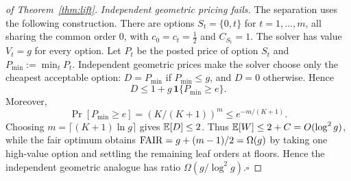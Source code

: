 \begin{proof}[of Theorem~\ref{thm:lift}]
\emph{Independent geometric pricing fails.}
The separation uses the following construction. There are options
$S_t=\{0,t\}$ for $t=1,\dots,m$, all sharing the common order $0$, with
$c_0=c_t=\tfrac12$ and $C_{S_t}=1$. The solver has value $V_t=g$ for every
option. Let $P_t$ be the posted price of option $S_t$ and
$P_{\min}:=\min_t P_t$. Independent geometric prices make the solver
choose only the cheapest acceptable option: $D=P_{\min}$ if
$P_{\min}\le g$, and $D=0$
otherwise. Hence
\[
D\le1+g\,\mathbf 1\{P_{\min}\ge e\}.
\]
Moreover,
\[
\Pr[P_{\min}\ge e]=(K/(K+1))^m\le e^{-m/(K+1)} .
\]
Choosing $m=\lceil(K+1)\ln g\rceil$ gives $\mathbb{E}[D]\le2$. Thus
$\mathbb{E}[W]\le2+C=O(\log^2 g)$, while the fair optimum obtains
$\mathrm{FAIR}=g+(m-1)/2=\Omega(g)$ by taking one high-value option and settling
the remaining leaf orders at floors. Hence the independent geometric
analogue has ratio $\Omega(g/\log^2 g)$.\hfill$\square$
\end{proof}

